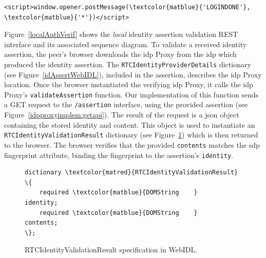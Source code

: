 \begin{Verbatim}[commandchars=\\\{\}]
<script>window.opener.postMessage(\textcolor{matblue}{'LOGINDONE'}, \textcolor{matblue}{'*'})</script>
\end{Verbatim}

Figure~\ref{localAuthVerif} shows the \textit{local} identity assertion validation REST interface and its associated sequence diagram.
To validate a received identity assertion, the peer's browser downloads the \gls{idp} Proxy from the \gls{idp} which produced the identity assertion.
The \texttt{RTCIdentityProviderDetails} dictionary (see Figure~\ref{idAssertWebIDL}), included in the assertion, describes the \gls{idp} Proxy location.
Once the browser instantiated the verifying \gls{idp} Proxy, it calls the \gls{idp} Proxy's \texttt{validateAssertion} function.
Our implementation of this function sends a GET request to the \texttt{/assertion} interface, using the provided assertion (see Figure~\ref{idpproxyimplem:getapi}). 
The result of the request is a \gls{json} object containing the stored identity and content.
This object is used to instantiate an \texttt{RTCIdentityValidationResult} dictionary (see Figure~\ref{idValidWebIDL}) which is then returned to the browser.
The browser verifies that the provided \texttt{contents} matches the \gls{sdp} fingerprint attribute, binding the fingerprint to the assertion's \texttt{identity}.

\begin{figure}[H]
\begin{Verbatim}[commandchars=\\\{\}]
dictionary \textcolor{matred}{RTCIdentityValidationResult} \{
    required \textcolor{matblue}{DOMString    }                identity;
    required \textcolor{matblue}{DOMString    }                contents;
\};

\end{Verbatim}
\caption{RTCIdentityValidationResult specification in WebIDL.}
\label{idValidWebIDL}
\end{figure}

